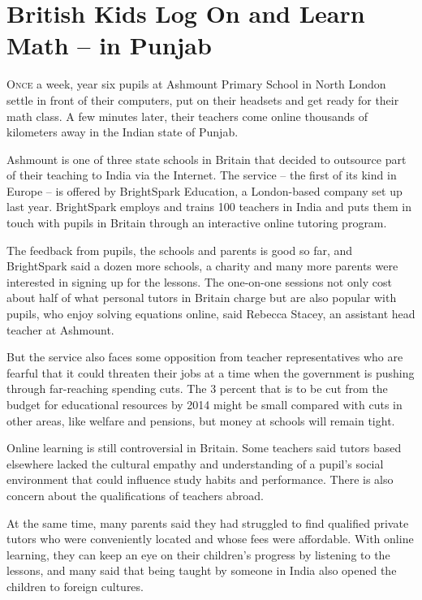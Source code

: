 ﻿\documentclass[12pt]{article}
\begin{document}
\section{British Kids Log On and Learn Math -- in Punjab}

\lettrine{O}{nce} a week, year six pupils at Ashmount Primary School in
North London settle in front of their computers, put on their headsets and get ready for their math
class. A few minutes later, their teachers come online thousands of kilometers away in the Indian
state of Punjab.

Ashmount is one of three state schools in Britain that decided to outsource part of their teaching
to India via the Internet. The service -- the first of its kind in Europe -- is offered by
BrightSpark Education, a London-based company set up last year. BrightSpark employs and trains 100
teachers in India and puts them in touch with pupils in Britain through an interactive online
tutoring program.

The feedback from pupils, the schools and parents is good so far, and BrightSpark said a dozen more
schools, a charity and many more parents were interested in signing up for the lessons. The
one-on-one sessions not only cost about half of what personal tutors in Britain charge but are also
popular with pupils, who enjoy solving equations online, said Rebecca Stacey, an assistant head
teacher at Ashmount.

But the service also faces some opposition from teacher representatives who are fearful that it
could threaten their jobs at a time when the government is pushing through far-reaching spending
cuts. The 3 percent that is to be cut from the budget for educational resources by 2014 might be
small compared with cuts in other areas, like welfare and pensions, but money at schools will remain
tight.

Online learning is still controversial in Britain. Some teachers said tutors based elsewhere lacked
the cultural empathy and understanding of a pupil's social environment that could influence study
habits and performance. There is also concern about the qualifications of teachers abroad.

At the same time, many parents said they had struggled to find qualified private tutors who were
conveniently located and whose fees were affordable. With online learning, they can keep an eye on
their children's progress by listening to the lessons, and many said that being taught by someone in
India also opened the children to foreign cultures.
\end{document}
